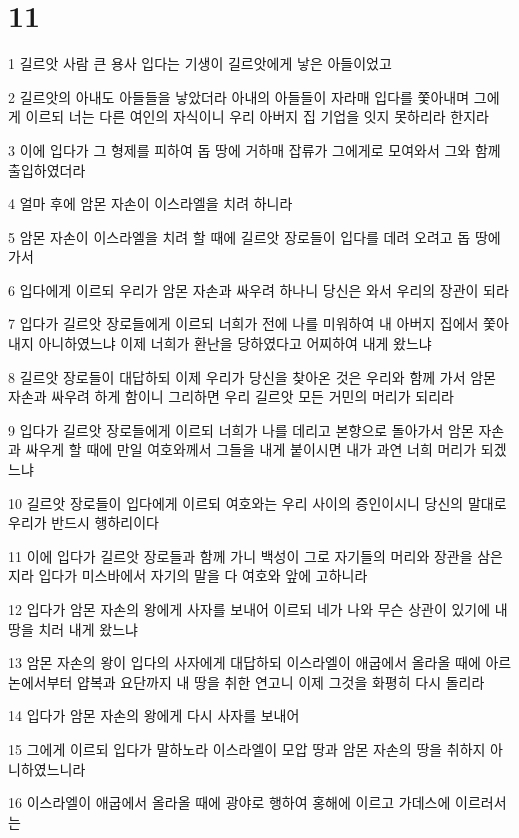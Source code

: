 \chapter{11}

\par 1 길르앗 사람 큰 용사 입다는 기생이 길르앗에게 낳은 아들이었고
\par 2 길르앗의 아내도 아들들을 낳았더라 아내의 아들들이 자라매 입다를 쫓아내며 그에게 이르되 너는 다른 여인의 자식이니 우리 아버지 집 기업을 잇지 못하리라 한지라
\par 3 이에 입다가 그 형제를 피하여 돕 땅에 거하매 잡류가 그에게로 모여와서 그와 함께 출입하였더라
\par 4 얼마 후에 암몬 자손이 이스라엘을 치려 하니라
\par 5 암몬 자손이 이스라엘을 치려 할 때에 길르앗 장로들이 입다를 데려 오려고 돕 땅에 가서
\par 6 입다에게 이르되 우리가 암몬 자손과 싸우려 하나니 당신은 와서 우리의 장관이 되라
\par 7 입다가 길르앗 장로들에게 이르되 너희가 전에 나를 미워하여 내 아버지 집에서 쫓아내지 아니하였느냐 이제 너희가 환난을 당하였다고 어찌하여 내게 왔느냐
\par 8 길르앗 장로들이 대답하되 이제 우리가 당신을 찾아온 것은 우리와 함께 가서 암몬 자손과 싸우려 하게 함이니 그리하면 우리 길르앗 모든 거민의 머리가 되리라
\par 9 입다가 길르앗 장로들에게 이르되 너희가 나를 데리고 본향으로 돌아가서 암몬 자손과 싸우게 할 때에 만일 여호와께서 그들을 내게 붙이시면 내가 과연 너희 머리가 되겠느냐
\par 10 길르앗 장로들이 입다에게 이르되 여호와는 우리 사이의 증인이시니 당신의 말대로 우리가 반드시 행하리이다
\par 11 이에 입다가 길르앗 장로들과 함께 가니 백성이 그로 자기들의 머리와 장관을 삼은지라 입다가 미스바에서 자기의 말을 다 여호와 앞에 고하니라
\par 12 입다가 암몬 자손의 왕에게 사자를 보내어 이르되 네가 나와 무슨 상관이 있기에 내 땅을 치러 내게 왔느냐
\par 13 암몬 자손의 왕이 입다의 사자에게 대답하되 이스라엘이 애굽에서 올라올 때에 아르논에서부터 얍복과 요단까지 내 땅을 취한 연고니 이제 그것을 화평히 다시 돌리라
\par 14 입다가 암몬 자손의 왕에게 다시 사자를 보내어
\par 15 그에게 이르되 입다가 말하노라 이스라엘이 모압 땅과 암몬 자손의 땅을 취하지 아니하였느니라
\par 16 이스라엘이 애굽에서 올라올 때에 광야로 행하여 홍해에 이르고 가데스에 이르러서는
